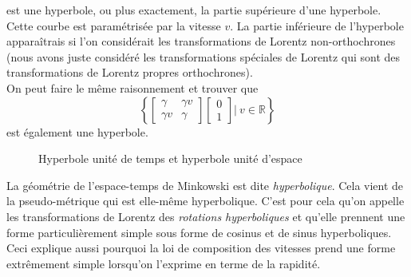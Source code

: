 \documentclass[a4paper,11pt]{report}
\begin{document}
            est une hyperbole, ou plus exactement, la partie supérieure d'une hyperbole. Cette courbe est paramétrisée par la vitesse $v$. La partie inférieure de l'hyperbole apparaîtrais si l'on considérait les transformations de Lorentz non-orthochrones (nous avons juste considéré les transformations spéciales de Lorentz qui sont des transformations de Lorentz propres orthochrones).\\
            
            On peut faire le même raisonnement et trouver que 
            \begin{equation}
            \left\{ \begin{bmatrix}
                \gamma & \gamma v \\
                \gamma v & \gamma 
            \end{bmatrix}
            \begin{bmatrix}
                    0\\
                    1
            \end{bmatrix} \Bigg\vert~ v\in\mathbb{R}\right\}
            \end{equation}
            est également une hyperbole.
            
            \begin{figure}[H]
            \centering
            \caption{Hyperbole unité de temps et hyperbole unité d'espace}
            \end{figure}
            
            La géométrie de l'espace-temps de Minkowski est dite \textit{hyperbolique}. Cela vient de la pseudo-métrique qui est elle-même hyperbolique. C'est pour cela qu'on appelle les transformations de Lorentz des \textit{rotations hyperboliques} et qu'elle prennent une forme particulièrement simple sous forme de cosinus et de sinus hyperboliques. Ceci explique aussi pourquoi la loi de composition des vitesses prend une forme extrêmement simple lorsqu'on l'exprime en terme de la rapidité.\\
            
\end{document}
